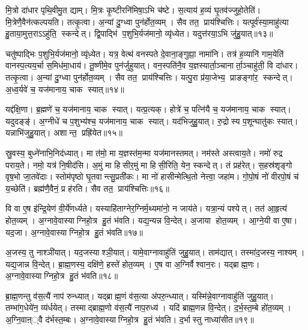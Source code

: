 मि॒त्रो दा॑धार पृथि॒वीमु॒त द्याम्।
मि॒त्रः कृ॒ष्टीरनि॑मिषा॒ऽभि च॑ष्टे।
स॒त्याय॑ ह॒व्यं घृ॒तव॑ज्जुहो॒तेति॑।
मि॒त्रेणै॒वैन॑त्कल्पयति।
तत्कृ॒त्वा।
अ॒न्यां दु॒ग्ध्वा पुन॑र्\mbox{}होत॒व्यम्।
सैव तत॒ प्राय॑श्चित्तिः।
यत्पूर्व॑स्या॒माहु॑त्या हु॒ताया॒मुत्त॒राऽऽहु॑ति॒ स्कन्देत्।
द्वि॒पाद्भि॑ प॒शुभि॒र्यज॑मानो॒ व्यृ॑ध्येत।
यदुत्त॑रया॒ऽभि जु॑हु॒यात्॥१३॥

चतु॑ष्पाद्भिः प॒शुभि॒र्यज॑मानो॒ व्यृ॑ध़्येत।
यत्र॒ वेत्थ॑ वनस्पते दे॒वाना॒ङ्गुह्या॒ नामा॑नि।
तत्र॑ ह॒व्यानि॑ गाम॒येति॑ वानस्प॒त्यय॒र्चा स॒मिध॑मा॒धाय॑।
तू॒ष्णीमे॒व पुन॑र्जुहुयात्।
वन॒स्पति॑नै॒व य॒ज्ञस्यार्ता॒ञ्चानार्ता॒ञ्चाहु॑ती॒ वि दा॑धार।
तत्कृ॒त्वा।
अ॒न्यां दु॒ग्ध्वा पुन॑र्\mbox{}होत॒व्यम्।
सैव तत॒ प्राय॑श्चित्तिः।
यत्पु॒रा प्र॑या॒जेभ्य॒ प्राङङ्गा॑र॒ स्कन्देत्।
अ॒ध्व॒र्यवे॑ च॒ यज॑मानाय॒ चाक स्यात्॥१४॥

यद्द॑क्षि॒णा।
ब्र॒ह्मणे॑ च॒ यज॑मानाय॒ चाक स्यात्।
यत्प्र॒त्यक्।
होत्रे॑ च॒ पत्नि॑यै च॒ यज॑मानाय॒ चाक स्यात्।
यदुदङ्ङ्॑।
अ॒ग्नीधे॑ च प॒शुभ्य॑श्च॒ यज॑मानाय॒ चाक स्यात्।
यद॑भिजुहु॒यात्।
रु॒द्रोस्य प॒शून्घातु॑कः स्यात्।
यन्नाभि॑जुहु॒यात्।
अशान्त॒ प्रह्रि॑येत॥१५॥

स्रु॒वस्य॒ बुध्ने॑नाभि॒निद॑ध्यात्।
मा त॑मो॒ मा य॒ज्ञस्त॑म॒न्मा यज॑मानस्तमत्।
नम॑स्ते अस्त्वाय॒ते।
नमो॑ रुद्र पराय॒ते।
नमो॒ यत्र॑ नि॒षीद॑सि।
अ॒मुं मा हिसीर॒मुं मा हिसी॒रिति॒ येन॒ स्कन्देत्।
तं प्रह॑रेत्।
स॒हस्र॑शृङ्गो वृष॒भो जा॒तवे॑दाः।
स्तोम॑पृष्ठो घृ॒तवान्त्सु॒प्रती॑कः।
मा नो॑ हासीन्मेत्थि॒तो नेत्त्वा॒ जहा॑म।
गो॒पो॒षं नो॑ वीरपो॒षं च॑ य॒च्छेति॑।
ब्रह्म॑णै॒वैनं॒ प्र ह॑रति।
सैव तत॒ प्राय॑श्चित्तिः॥१६॥

वि वा ए॒ष इ॑न्द्रि॒येण॑ वी॒र्ये॑णर्ध्यते।
यस्याहि॑ताग्नेर॒ग्निर्म॒थ्यमा॑नो॒ न जाय॑ते।
यत्रा॒न्यं पश्येत्।
तत॑ आ॒हृत्य॑ होत॒व्यम्।
अ॒ग्नावे॒वास्याग्निहो॒त्र हु॒तं भ॑वति।
यद्य॒न्यन्न वि॒न्देत्।
अ॒जाया होत॒व्यम्।
आ॒ग्ने॒यी वा ए॒षा।
यद॒जा।
अ॒ग्नावे॒वास्याग्निहो॒त्र हु॒तं भ॑वति॥१७॥

अ॒जस्य॒ तु नाश्ञी॑यात्।
यद॒जस्याश्ञी॒यात्।
यामे॒वाग्नावाहु॑तिं जुहु॒यात्।
ताम॑द्यात्।
तस्मा॑द॒जस्य॒ नाश्यम्।
यद्य॒जान्न वि॒न्देत्।
ब्रा॒ह्म॒णस्य॒ दक्षि॑णे॒ हस्ते॑ होत॒व्यम्।
ए॒ष वा अ॒ग्निर्वैश्वान॒रः।
यद्ब्राह्म॒णः।
अ॒ग्नावे॒वास्याग्निहो॒त्र हु॒तं भ॑वति॥१८॥

ब्रा॒ह्म॒णन्तु व॑स॒त्यै॑ नाप॑ रुन्ध्यात्।
यद्ब्राह्म॒णं व॑स॒त्या अ॑परु॒न्ध्यात्।
यस्मि॑न्ने॒वाग्नावाहु॑तिं जुहु॒यात्।
तम्भा॑ग॒धेये॑न॒ व्य॑र्धयेत्।
तस्माद्ब्राह्म॒णो व॑स॒त्यै॑ नाप॒रुध्य॑।
यदि॑ ब्राह्म॒णन्न वि॒न्देत्।
द॒र्भ॒स्त॒म्बे हो॑त॒व्यम्।
अ॒ग्नि॒वाऩ््वै द॑र्भस्त॒म्बः।
अ॒ग्नावे॒वास्याग्निहो॒त्र हु॒तं भ॑वति।
द॒र्भास्तु नाध्या॑सीत॥१९॥

